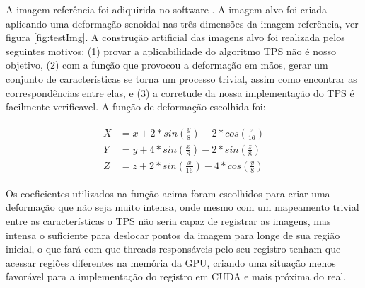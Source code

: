   A imagem referência foi adiquirida no software \cite{papademetris2005bioimage}.
A imagem alvo foi criada aplicando uma deformação senoidal nas três dimensões da
imagem referência, ver figura \ref{fig:testImg}. A construção artificial das
imagens alvo foi realizada pelos seguintes motivos: (1) provar a aplicabilidade
do algoritmo TPS não é nosso objetivo, (2) com a função que provocou a
deformação em mãos, gerar um conjunto de características se torna um processo
trivial, assim como encontrar as correspondências entre elas, e (3) a corretude
da nossa implementação do TPS é facilmente verificavel. A função de deformação
escolhida foi:

\begin{align} \label{math:composta}
\begin{split}
  X &= x + 2*sin(\frac{y}{8}) - 2*cos(\frac{z}{16}) \\
  Y &= y + 4*sin(\frac{x}{8}) - 2*sin(\frac{z}{8}) \\
  Z &= z + 2*sin(\frac{x}{16}) - 4*cos(\frac{y}{8})
\end{split}
\end{align}

  Os coeficientes utilizados na função acima foram escolhidos para criar uma
deformação que não seja muito intensa, onde mesmo com um mapeamento trivial
entre as características o TPS não seria capaz de registrar as imagens, mas
intensa o suficiente para deslocar pontos da imagem para longe de sua região
inicial, o que fará com que threads responsáveis pelo seu registro tenham que
acessar regiões diferentes na memória da GPU, criando uma situação menos
favorável para a implementação do registro em CUDA e mais próxima do real.

